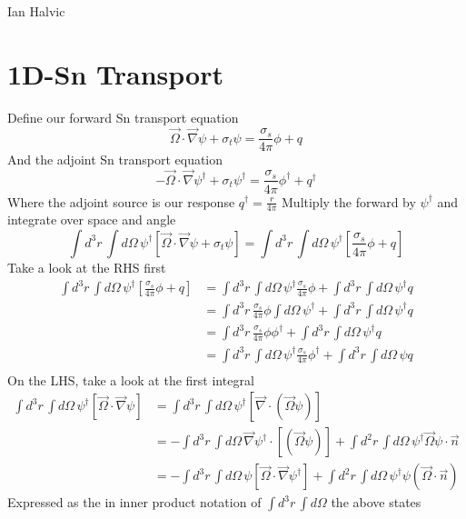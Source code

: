 \documentclass{article}
\newcommand{\vO}{\vec{\Omega}}
\newcommand{\vdiv}{\vec{\nabla} \cdot}
\newcommand{\vgrad}{\vec{\nabla}}
\begin{document}
\begin{center}
Ian Halvic \\
\end{center}

\section{1D-Sn Transport}
Define our forward Sn transport equation
\[
\vO \cdot \vgrad \psi + \sigma_t \psi = \frac{\sigma_s}{4 \pi} \phi + q
\]
And the adjoint Sn transport equation
\[
- \vO \cdot \vgrad \psi^\dag + \sigma_t \psi^\dag = \frac{\sigma_s}{4 \pi} \phi^\dag + q^\dag
\]
Where the adjoint source is our response $q^\dag = \frac{r}{4 \pi}$
Multiply the forward by $\psi^\dag$ and integrate over space and angle
\[
\int d^3 r \, \int d  \Omega \,  \psi^\dag \left[ \vO \cdot \vgrad \psi + \sigma_t \psi  \right] = 
\int d^3 r \, \int d  \Omega \,  \psi^\dag \left[ \frac{\sigma_s}{4 \pi} \phi + q \right]
\]
Take a look at the RHS first
\begin{align*}
\int d^3 r \, \int d  \Omega \,  \psi^\dag \left[ \frac{\sigma_s}{4 \pi} \phi + q \right]
&= 
\int d^3 r \, \int d  \Omega \,  \psi^\dag \frac{\sigma_s}{4 \pi} \phi + \int d^3 r \, \int d  \Omega \,  \psi^\dag q \\
&= 
\int d^3 r \, \frac{\sigma_s}{4 \pi} \phi \int d  \Omega \,  \psi^\dag  + \int d^3 r \, \int d  \Omega \,  \psi^\dag q \\
&= 
\int d^3 r \, \frac{\sigma_s}{4 \pi} \phi  \phi^\dag  + \int d^3 r \, \int d  \Omega \,  \psi^\dag q \\
&= 
\int d^3 r \, \int d  \Omega \,  \psi^\dag \frac{\sigma_s}{4 \pi} \phi^\dag + \int d^3 r \, \int d  \Omega \,  \psi q \\
\end{align*}
On the LHS, take a look at the first integral
\begin{align*}
\int d^3 r \, \int d  \Omega \,  \psi^\dag \left[  \vO \cdot \vgrad \psi \right]
&= \int d^3 r \, \int d  \Omega \,  \psi^\dag \left[  \vdiv (\vO \psi) \right] \\
&= - \int d^3 r \, \int d  \Omega \,  \vgrad \psi^\dag \cdot \left[(\vO \psi) \right] 
+ \int d^2 r \, \int d  \Omega \, \psi^\dag \vO \psi \cdot \vec{n} \\
&= - \int d^3 r \, \int d  \Omega \,  \psi \left[  \vO \cdot \vgrad \psi^\dag \right] 
+ \int d^2 r \, \int d  \Omega \, \psi^\dag \psi ( \vO \cdot \vec{n})
\end{align*}
Expressed as the in inner product notation of $\int d^3 r \, \int d  \Omega $ the above states
\end{document}
